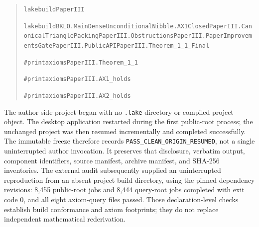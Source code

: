 \documentclass[english,11pt,a4paper]{article}
\begin{document}
\begin{quote}
{\LeanSymbols\fontsize{8}{10}\selectfont
\noindent \nolinkurl{lake}\hspace{0.45em}\nolinkurl{build}\hspace{0.45em}\nolinkurl{PaperIII}\par
\noindent \nolinkurl{lake}\hspace{0.45em}\nolinkurl{build}\hspace{0.45em}\nolinkurl{BKLO.MainDenseUnconditional}\hspace{0.45em}\nolinkurl{Nibble.AX1Closed}\hspace{0.45em}\nolinkurl{PaperIII.CanonicalTrianglePacking}\hspace{0.45em}\nolinkurl{PaperIII.Obstructions}\hspace{0.45em}\nolinkurl{PaperIII.PaperImprovementsGate}\hspace{0.45em}\nolinkurl{PaperIII.PublicAPI}\hspace{0.45em}\nolinkurl{PaperIII.Theorem_1_1_Final}\par
\noindent \nolinkurl{#print}\hspace{0.45em}\nolinkurl{axioms}\hspace{0.45em}\nolinkurl{PaperIII.Theorem_1_1}\par
\noindent \nolinkurl{#print}\hspace{0.45em}\nolinkurl{axioms}\hspace{0.45em}\nolinkurl{PaperIII.AX1_holds}\par
\noindent \nolinkurl{#print}\hspace{0.45em}\nolinkurl{axioms}\hspace{0.45em}\nolinkurl{PaperIII.AX2_holds}\par
}
\end{quote}

The author-side project began with no \nolinkurl{.lake} directory or
compiled project object. The desktop application restarted during the
first public-root process; the unchanged project was then resumed
incrementally and completed successfully. The immutable freeze therefore
records \nolinkurl{PASS_CLEAN_ORIGIN_RESUMED}, not a single
uninterrupted author invocation. It preserves that disclosure, verbatim
output, component identifiers, source manifest, archive manifest, and
SHA-256 inventories. The external audit subsequently supplied an
uninterrupted reproduction from an absent project build directory, using
the pinned dependency revisions: 8,455 public-root jobs and 8,444
query-root jobs completed with exit code 0, and all eight axiom-query
files passed. Those declaration-level checks establish build conformance
and axiom footprints; they do not replace independent mathematical
rederivation.
\end{document}
